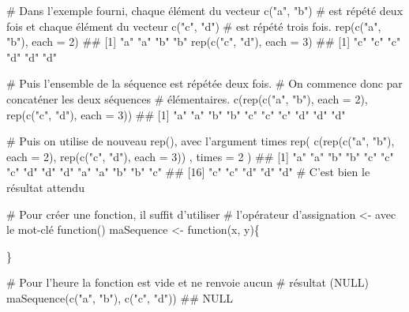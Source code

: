 \documentclass[12pt,twosided, notitlepage]{book}
\newenvironment{Shaded}{}{}
\newcommand{\KeywordTok}[1]{\textcolor[rgb]{0.00,0.00,1.00}{{#1}}}
\newcommand{\DataTypeTok}[1]{{#1}}
\newcommand{\DecValTok}[1]{{#1}}
\newcommand{\StringTok}[1]{\textcolor[rgb]{0.00,0.50,0.50}{{#1}}}
\newcommand{\CommentTok}[1]{\textcolor[rgb]{0.00,0.50,0.00}{{#1}}}
\newcommand{\NormalTok}[1]{{#1}}
\renewenvironment{Shaded}{\begin{snugshade}}{\end{snugshade}}
\begin{document}
\begin{enumerate}
\begin{Shaded}
\begin{Highlighting}[]
\CommentTok{# Dans l'exemple fourni, chaque élément du vecteur c("a", "b") }
\CommentTok{# est répété deux fois et chaque élément du vecteur c("c", "d") }
\CommentTok{# est répété trois fois.}
\KeywordTok{rep}\NormalTok{(}\KeywordTok{c}\NormalTok{(}\StringTok{"a"}\NormalTok{, }\StringTok{"b"}\NormalTok{), }\DataTypeTok{each =} \DecValTok{2}\NormalTok{)}
  \NormalTok{## [1] "a" "a" "b" "b"}
\KeywordTok{rep}\NormalTok{(}\KeywordTok{c}\NormalTok{(}\StringTok{"c"}\NormalTok{, }\StringTok{"d"}\NormalTok{), }\DataTypeTok{each =} \DecValTok{3}\NormalTok{)}
  \NormalTok{## [1] "c" "c" "c" "d" "d" "d"}

\CommentTok{# Puis l'ensemble de la séquence est répétée deux fois.}
\CommentTok{# On commence donc par concaténer les deux séquences}
\CommentTok{# élémentaires.}
\KeywordTok{c}\NormalTok{(}\KeywordTok{rep}\NormalTok{(}\KeywordTok{c}\NormalTok{(}\StringTok{"a"}\NormalTok{, }\StringTok{"b"}\NormalTok{), }\DataTypeTok{each =} \DecValTok{2}\NormalTok{), }\KeywordTok{rep}\NormalTok{(}\KeywordTok{c}\NormalTok{(}\StringTok{"c"}\NormalTok{, }\StringTok{"d"}\NormalTok{), }\DataTypeTok{each =} \DecValTok{3}\NormalTok{))}
  \NormalTok{##  [1] "a" "a" "b" "b" "c" "c" "c" "d" "d" "d"}

\CommentTok{# Puis on utilise de nouveau rep(), avec l'argument times}
\KeywordTok{rep}\NormalTok{(}
  \KeywordTok{c}\NormalTok{(}\KeywordTok{rep}\NormalTok{(}\KeywordTok{c}\NormalTok{(}\StringTok{"a"}\NormalTok{, }\StringTok{"b"}\NormalTok{), }\DataTypeTok{each =} \DecValTok{2}\NormalTok{), }\KeywordTok{rep}\NormalTok{(}\KeywordTok{c}\NormalTok{(}\StringTok{"c"}\NormalTok{, }\StringTok{"d"}\NormalTok{), }\DataTypeTok{each =} \DecValTok{3}\NormalTok{))}
  \NormalTok{, }\DataTypeTok{times =} \DecValTok{2}
\NormalTok{)}
  \NormalTok{##  [1] "a" "a" "b" "b" "c" "c" "c" "d" "d" "d" "a" "a" "b" "b" "c"}
  \NormalTok{## [16] "c" "c" "d" "d" "d"}
\CommentTok{# C'est bien le résultat attendu}

\CommentTok{# Pour créer une fonction, il suffit d'utiliser}
\CommentTok{# l'opérateur d'assignation <- avec le mot-clé function()}
\NormalTok{maSequence <-}\StringTok{ }\NormalTok{function(x, y)\{}

\NormalTok{\}}

\CommentTok{# Pour l'heure la fonction est vide et ne renvoie aucun}
\CommentTok{# résultat (NULL)}
\KeywordTok{maSequence}\NormalTok{(}\KeywordTok{c}\NormalTok{(}\StringTok{"a"}\NormalTok{, }\StringTok{"b"}\NormalTok{), }\KeywordTok{c}\NormalTok{(}\StringTok{"c"}\NormalTok{, }\StringTok{"d"}\NormalTok{))}
  \NormalTok{## NULL}


\end{Highlighting}
\end{Shaded}
\end{enumerate}
\end{document}
